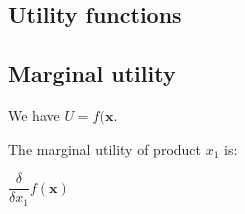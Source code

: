 
\subsection{Utility functions}

\subsection{Marginal utility}

We have \(U=f(\mathbf x\).

The marginal utility of product \(x_1\) is:

\(\dfrac{\delta }{\delta x_1}f(\mathbf x)\)

